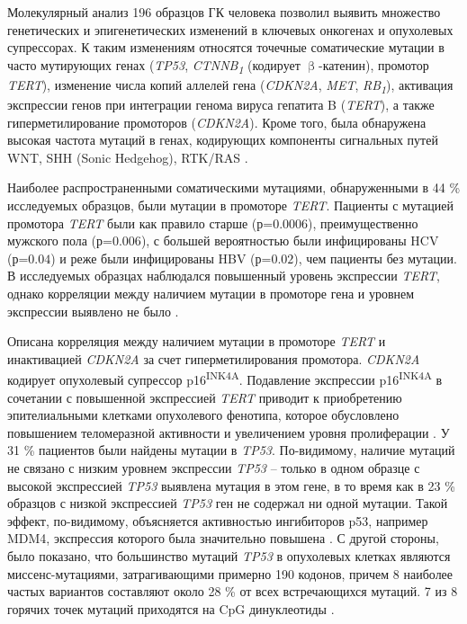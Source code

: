 Молекулярный анализ 196 образцов ГК человека позволил выявить множество генетических и эпигенетических изменений в ключевых онкогенах и опухолевых супрессорах. К таким изменениям относятся точечные соматические мутации в часто мутирующих генах (\textit{\textit{TP53}}, \textit{CTNNB\textsubscript{1}} (кодирует $\upbeta$-катенин), промотор \textit{TERT}), изменение числа копий аллелей гена (\textit{CDKN2A}, \textit{MET}, \textit{RB\textsubscript{1}}), активация экспрессии генов при интеграции генома вируса гепатита B (\textit{TERT}), а также гиперметилирование промоторов (\textit{CDKN2A}). Кроме того, была обнаружена высокая частота мутаций в генах, кодирующих компоненты сигнальных путей WNT, SHH (Sonic Hedgehog), RTK/RAS \cite{cancer_genome_atlas_research_network._electronic_address:_wheelerbcm.edu_comprehensive_2017}.

Наиболее распространенными соматическими мутациями, обнаруженными в 44 \% исследуемых образцов, были мутации в промоторе \textit{TERT}. Пациенты с мутацией промотора \textit{TERT} были как правило старше (р=$0.0006$), преимущественно мужского пола (р=$0.006$), с большей вероятностью были инфицированы HCV (р=$0.04$) и реже были инфицированы HBV (р=$0.02$), чем пациенты без мутации. В исследуемых образцах наблюдался повышенный уровень экспрессии \textit{TERT}, однако корреляции между наличием мутации в промоторе гена и уровнем экспрессии выявлено не было \cite{cancer_genome_atlas_research_network._electronic_address:_wheelerbcm.edu_comprehensive_2017}.

Описана корреляция между наличием мутации в промоторе \textit{TERT} и инактивацией \textit{CDKN2A} за счет гиперметилирования промотора. \textit{CDKN2A} кодирует опухолевый супрессор p16\textsuperscript{INK4A}. Подавление экспрессии p16\textsuperscript{INK4A} в сочетании с повышенной экспрессией \textit{TERT} приводит к приобретению эпителиальными клетками опухолевого фенотипа, которое обусловлено повышением теломеразной активности и увеличением уровня пролиферации \cite{kiyono_both_1998}. У 31 \% пациентов были найдены мутации в \textit{TP53}. По-видимому, наличие мутаций не связано с низким уровнем экспрессии \textit{TP53} – только в одном образце с высокой экспрессией \textit{TP53} выявлена мутация в этом гене, в то время как в 23 \% образцов с низкой экспрессией \textit{TP53} ген не содержал ни одной мутации. Такой эффект, по-видимому, объясняется активностью ингибиторов p53, например MDM4, экспрессия которого была значительно повышена \cite{cancer_genome_atlas_research_network._electronic_address:_wheelerbcm.edu_comprehensive_2017}. С другой стороны, было показано, что большинство мутаций \textit{TP53} в опухолевых клетках являются миссенс-мутациями, затрагивающими примерно 190 кодонов, причем 8 наиболее частых вариантов составляют около 28 \% от всех встречающихся мутаций. 7 из 8 горячих точек мутаций приходятся на CpG динуклеотиды \cite{baugh_why_2018}.

